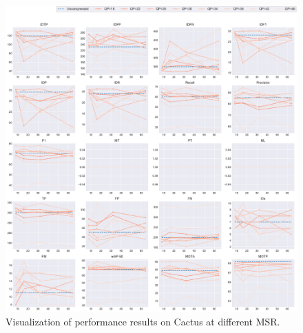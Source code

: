 \begin{figure}[!htbp]
\centering
\includegraphics[width=1.0\linewidth]{img/appendix/Cactus_all_multiplots_msr.pdf}
\caption[Visualization of performance results on Cactus at different MSR]
{Visualization of performance results on Cactus at different MSR.}
\label{fig:Cactus_all_msr}
\end{figure}



